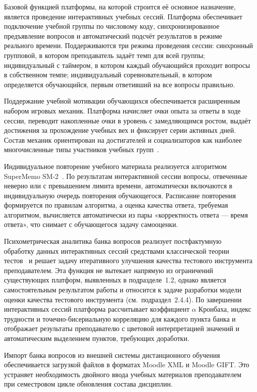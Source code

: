 Базовой функцией платформы, на которой строится её основное
назначение, является проведение интерактивных учебных сессий.
Платформа обеспечивает подключение учебной группы по числовому
коду, синхронизированное предъявление вопросов и автоматический
подсчёт результатов в режиме реального времени. Поддерживаются
три режима проведения сессии: синхронный групповой, в котором
преподаватель задаёт темп для всей группы; индивидуальный с таймером,
в котором каждый обучающийся проходит вопросы в собственном темпе;
индивидуальный соревновательный, в котором определяется
обучающийся, первым ответивший на все вопросы правильно.

Поддержание учебной мотивации обучающихся обеспечивается расширенным
набором игровых механик. Платформа начисляет очки опыта за ответы
в ходе сессии, переводит накопленные очки в уровень с замедляющимся
ростом, выдаёт достижения за прохождение учебных вех и фиксирует
серии активных дней. Состав механик ориентирован на достигателей
и социализаторов как наиболее многочисленные типы участников
учебных групп~\cite{bartle1996}.

Индивидуальное повторение учебного материала реализуется алгоритмом
SuperMemo SM-2~\cite{wozniak1990}. По результатам интерактивной
сессии вопросы, отвеченные неверно или с превышением лимита времени,
автоматически включаются в индивидуальную очередь повторения
обучающегося. Расписание повторения формируется по правилам
алгоритма, а оценка качества ответа, требуемая алгоритмом, вычисляется
автоматически из пары «корректность ответа --- время ответа», что
снимает с обучающегося задачу самооценки.

Психометрическая аналитика банка вопросов реализует постфактумную
обработку данных интерактивных сессий средствами классической
теории тестов~\cite{cronbach1951,crocker_algina} и решает задачу
итеративного улучшения качества тестового инструмента
преподавателем. Эта функция не вытекает напрямую из ограничений
существующих платформ, выявленных в подразделе~1.2, однако является
самостоятельным результатом работы и относится к задаче разработки
модели оценки качества тестового инструмента (см.~подраздел~2.4.4). По завершении
интерактивных сессий платформа рассчитывает коэффициент
$\alpha$ Кронбаха, индекс трудности и точечно-бисериальную корреляцию
для каждого пункта банка и отображает результаты преподавателю
с цветовой интерпретацией значений и автоматическим выделением
пунктов, требующих доработки.

Импорт банка вопросов из внешней системы дистанционного обучения
обеспечивается загрузкой файлов в форматах Moodle XML и Moodle GIFT.
Это устраняет необходимость двойного ввода учебных материалов
преподавателем при семестровом цикле обновления состава дисциплин.

